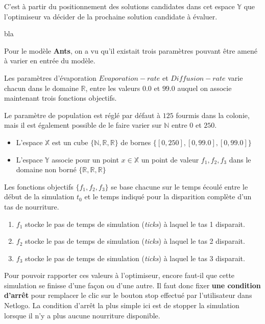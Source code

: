C'est à partir du positionnement des solutions candidates dans cet espace $\mathbb{Y}$ que l'optimiseur va décider de la prochaine solution candidate à évaluer.

\begin{framewithtitle}[bla]{bla}

Pour le modèle \textbf{Ants}, on a vu qu'il existait trois paramètres pouvant être amené à varier en entrée du modèle. 


Les paramètres d'évaporation $Evaporation-rate$ et $Diffusion-rate$ varie chacun dans le domaine $\mathbb{R}$, entre les valeurs $0.0$ et $99.0$ auquel on associe maintenant trois fonctions objectifs.

Le paramètre de population est réglé par défaut à $125$ fourmis dans la colonie, mais il est également possible de le faire varier sur $\mathbb{N}$ entre $0$ et $250$. 

\begin{itemize}[noitemsep,nolistsep]
\item L'espace $\mathbb{X}$ est un cube $\{\mathbb{N},\mathbb{R},\mathbb{R}\}$ de bornes $\{[0,250], [0,99.0], [0,99.0]\}$
\item L'espace $\mathbb{Y}$ associe pour un point $x \in \mathbb{X}$ un point de valeur ${f_1,f_2,f_3}$ dans le domaine non borné $\{\mathbb{R},\mathbb{R},\mathbb{R}\}$
\end{itemize}

Les fonctions objectifs $\{f_1,f_2,f_3\}$  se base chacune sur le temps écoulé entre le début de la simulation $t_0$ et le temps indiqué pour la disparition complète d'un tas de nourriture.

\begin{enumerate}
\item $f_1$ stocke le pas de temps de simulation (\textit{ticks}) à laquel le tas 1 disparait.
\item $f_2$ stocke le pas de temps de simulation (\textit{ticks}) à laquel le tas 2 disparait.
\item $f_3$ stocke le pas de temps de simulation (\textit{ticks}) à laquel le tas 3 disparait.
\end{enumerate}

Pour pouvoir rapporter ces valeurs à l'optimiseur, encore faut-il que cette simulation se finisse d'une façon ou d'une autre. Il faut donc fixer \textbf{une condition d'arrêt} pour remplacer le clic sur le bouton stop effectué par l'utilisateur dans Netlogo. La condition d'arrêt la plus simple ici est de stopper la simulation lorsque il n'y a plus aucune nourriture disponible.


\end{framewithtitle}
